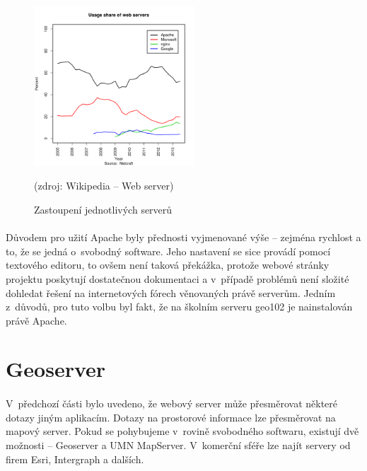 \documentclass[11pt,a4paper,titlepage,oneside]{book}
\begin{document}

		\begin{figure}[!h]
			\begin{center}
				\includegraphics[width=6cm]{obrazky/servers_share.png}
				\caption{Zastoupení jednotlivých serverů}
				(zdroj: Wikipedia -- Web server\cite{wiki_webServer})
			\end{center}
		\end{figure}

		\paragraph{} Důvodem pro užití Apache byly přednosti vyjmenované výše -- zejména rychlost a to, že se jedná o~svobodný software. Jeho nastavení se sice provádí pomocí textového editoru, to ovšem není taková překážka, protože webové stránky projektu poskytují dostatečnou dokumentaci a v~případě problémů není složité dohledat řešení na internetových fórech věnovaných právě serverům. Jedním z~důvodů, pro tuto volbu byl fakt, že na školním serveru geo102 je nainstalován právě Apache.

	\section{Geoserver}
		\paragraph{} V~předchozí části bylo uvedeno, že webový server může přesměrovat některé dotazy jiným aplikacím. Dotazy na prostorové informace lze přesměrovat na mapový server. Pokud se pohybujeme v~rovině svobodného softwaru, existují dvě možnosti -- Geoserver a UMN MapServer. V~komerční sféře lze najít servery od firem Esri, Intergraph a dalších. 

\end{document}
